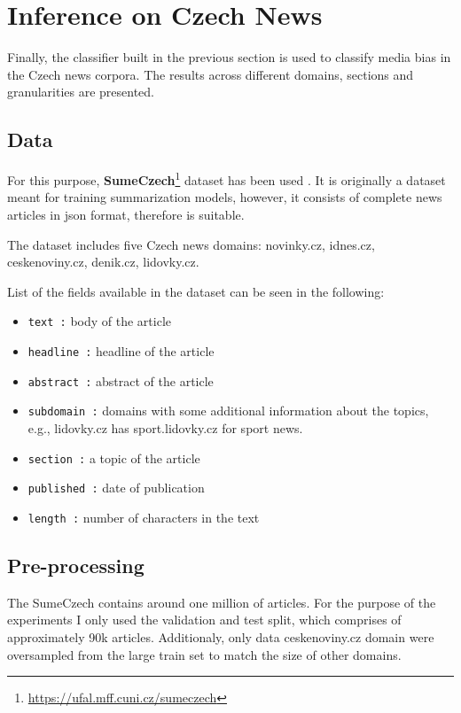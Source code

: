 \chapter{Inference on Czech News}\label{inference}
Finally, the classifier built in the previous section is used to classify media bias in the Czech news corpora. The results across different domains, sections and granularities are presented.




\section{Data}
For this purpose, \textbf{SumeCzech}\footnote{\url{https://ufal.mff.cuni.cz/sumeczech}} dataset has been used \cite{straka2018sumeczech}. It is originally a dataset meant for training summarization models, however, it consists of complete news articles in json format, therefore is suitable.

The dataset includes five Czech news domains: novinky.cz, idnes.cz, ceskenoviny.cz, denik.cz, lidovky.cz. 

List of the fields available in the dataset can be seen in the following:
\begin{itemize}
    \item \verb|text :| body of the article
    \item \verb|headline :| headline of the article
    \item \verb|abstract :|  abstract of the article
    \item \verb|subdomain :| domains with some additional information about the topics, e.g., lidovky.cz has sport.lidovky.cz for sport news.
    \item \verb|section :| a topic of the article
    \item \verb|published :| date of publication
    \item \verb|length :| number of characters in the text
\end{itemize}



\section{Pre-processing}
The SumeCzech contains around one million of articles. For the purpose of the experiments I only used the validation and test split, which comprises of approximately 90k articles. Additionaly, only data ceskenoviny.cz domain were oversampled from the large train set to match the size of other domains.

